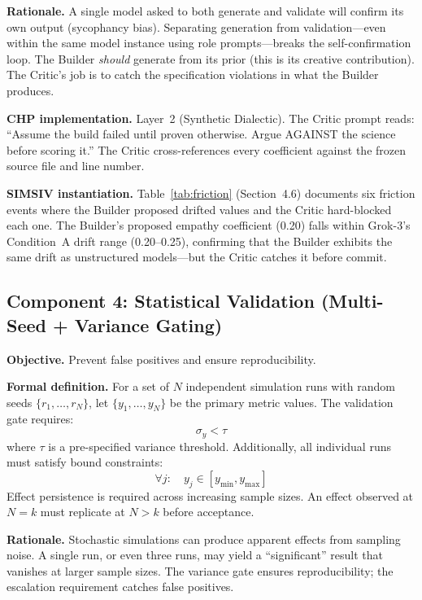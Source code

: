 \documentclass[11pt,a4paper]{article}
\begin{document}
\textbf{Rationale.} A single model asked to both generate and validate will confirm its own output (sycophancy bias). Separating generation from validation---even within the same model instance using role prompts---breaks the self-confirmation loop. The Builder \textit{should} generate from its prior (this is its creative contribution). The Critic's job is to catch the specification violations in what the Builder produces.

\textbf{CHP implementation.} Layer~2 (Synthetic Dialectic). The Critic prompt reads: ``Assume the build failed until proven otherwise. Argue AGAINST the science before scoring it.'' The Critic cross-references every coefficient against the frozen source file and line number.

\textbf{SIMSIV instantiation.} Table~\ref{tab:friction} (Section~4.6) documents six friction events where the Builder proposed drifted values and the Critic hard-blocked each one. The Builder's proposed empathy coefficient (0.20) falls within Grok-3's Condition~A drift range (0.20--0.25), confirming that the Builder exhibits the same drift as unstructured models---but the Critic catches it before commit.

\subsection{Component 4: Statistical Validation (Multi-Seed + Variance Gating)}

\textbf{Objective.} Prevent false positives and ensure reproducibility.

\textbf{Formal definition.} For a set of $N$ independent simulation runs with random seeds $\{r_1, \ldots, r_N\}$, let $\{y_1, \ldots, y_N\}$ be the primary metric values. The validation gate requires:
\begin{equation}
\sigma_y < \tau
\end{equation}
where $\tau$ is a pre-specified variance threshold. Additionally, all individual runs must satisfy bound constraints:
\begin{equation}
\forall j: \quad y_j \in [y_{\min}, y_{\max}]
\end{equation}
Effect persistence is required across increasing sample sizes. An effect observed at $N = k$ must replicate at $N > k$ before acceptance.

\textbf{Rationale.} Stochastic simulations can produce apparent effects from sampling noise. A single run, or even three runs, may yield a ``significant'' result that vanishes at larger sample sizes. The variance gate ensures reproducibility; the escalation requirement catches false positives.
\end{document}
